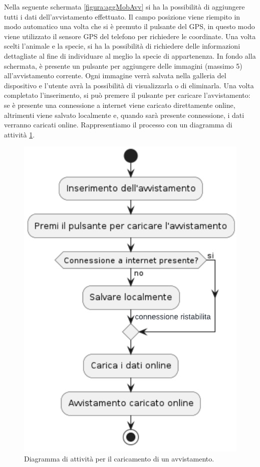 \documentclass[a4paper,final,12pt]{report}
\begin{document}
Nella seguente schermata \ref{figura:aggMobAvv}
 si ha la possibilità di aggiungere tutti i dati dell'avvistamento effettuato. Il campo posizione viene riempito in modo automatico una volta che si è premuto il pulsante del GPS, in questo modo viene utilizzato il sensore GPS del telefono per richiedere le coordinate. Una volta scelti l'animale e la specie, si ha la possibilità di richiedere delle informazioni dettagliate al fine di individuare al meglio la specie di appartenenza. In fondo alla schermata, è presente un pulsante per aggiungere delle immagini (massimo 5) all'avvistamento corrente. Ogni immagine verrà salvata nella galleria del dispositivo e l'utente avrà la possibilità di visualizzarla o di eliminarla. Una volta completato l'inserimento, si può premere il pulsante per caricare l'avvistamento: se è presente una connessione a internet viene caricato direttamente online, altrimenti viene salvato localmente e, quando sarà presente connessione, i dati verranno caricati online. Rappresentiamo il processo con un diagramma di attività \ref{figura:diagattvicaric}.
\begin{figure}[hbtp]
\centering
\includegraphics[scale=1]{img_concettuale/dAtt.png}
\caption{Diagramma di attività per il caricamento di un avvistamento.}
\label{figura:diagattvicaric}
\end{figure}
\end{document}
